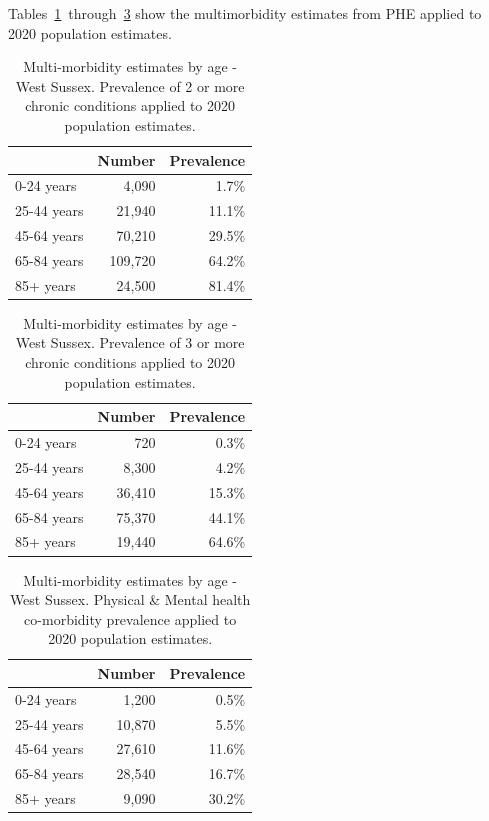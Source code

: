 Tables~\ref{tab:op:2_plus_conds}~through~\ref{tab:op:m_and_p} show the multimorbidity estimates from PHE applied to 2020 population estimates.

\begin{table}
    \caption{Multi-morbidity estimates by age - West Sussex. Prevalence of 2 or more chronic conditions applied to 2020 population estimates.}
    \centering
    \begin{tabular}{lrr}
        \toprule
        \ & Number & Prevalence \\
        \midrule
        0-24 years & 4,090 & 1.7\% \\
        25-44 years & 21,940 & 11.1\% \\
        45-64 years & 70,210 & 29.5\% \\
        65-84 years & 109,720 & 64.2\% \\
        85+ years & 24,500 & 81.4\% \\
        \bottomrule
    \end{tabular}
    \label{tab:op:2_plus_conds}
\end{table}

\begin{table}
    \caption{Multi-morbidity estimates by age - West Sussex. Prevalence of 3 or more chronic conditions applied to 2020 population estimates.}
    \centering
    \begin{tabular}{lrr}
        \toprule
        \ & Number & Prevalence \\
        \midrule
        0-24 years & 720 & 0.3\% \\
        25-44 years & 8,300 & 4.2\% \\
        45-64 years & 36,410 & 15.3\% \\
        65-84 years & 75,370 & 44.1\% \\
        85+ years & 19,440 & 64.6\% \\
        \bottomrule
    \end{tabular}
    \label{tab:op:3_plus_conds}
\end{table}

\begin{table}
    \caption{Multi-morbidity estimates by age - West Sussex. Physical \& Mental health co-morbidity prevalence applied to 2020 population estimates.}
    \centering
    \begin{tabular}{lrr}
        \toprule
        \ & Number & Prevalence \\
        \midrule
        0-24 years & 1,200 & 0.5\% \\
        25-44 years & 10,870 & 5.5\% \\
        45-64 years & 27,610 & 11.6\% \\
        65-84 years & 28,540 & 16.7\% \\
        85+ years & 9,090 & 30.2\% \\
        \bottomrule
    \end{tabular}
    \label{tab:op:m_and_p}
\end{table}

